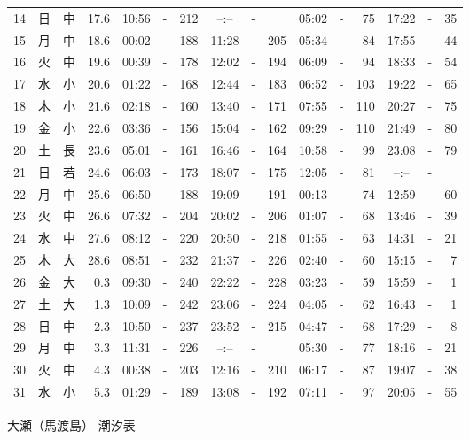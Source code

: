 \documentclass[12pt.a4j]{jsarticle}
\begin{document}
\begin{center}
\begin{table}[ht]
\begin{tabular}{|rc|cr|ccrccr|ccrccr|}
14 & 日 & 中 & 17.6 &  10:56 &-& 212  &  --:-- &-&     &   05:02 &-&  75  &   17:22 &-&  35  \\
15 & 月 & 中 & 18.6 &  00:02 &-& 188  &  11:28 &-& 205  &   05:34 &-&  84  &   17:55 &-&  44  \\
16 & 火 & 中 & 19.6 &  00:39 &-& 178  &  12:02 &-& 194  &   06:09 &-&  94  &   18:33 &-&  54  \\
17 & 水 & 小 & 20.6 &  01:22 &-& 168  &  12:44 &-& 183  &   06:52 &-& 103  &   19:22 &-&  65  \\
18 & 木 & 小 & 21.6 &  02:18 &-& 160  &  13:40 &-& 171  &   07:55 &-& 110  &   20:27 &-&  75  \\
19 & 金 & 小 & 22.6 &  03:36 &-& 156  &  15:04 &-& 162  &   09:29 &-& 110  &   21:49 &-&  80  \\
20 & 土 & 長 & 23.6 &  05:01 &-& 161  &  16:46 &-& 164  &   10:58 &-&  99  &   23:08 &-&  79  \\
21 & 日 & 若 & 24.6 &  06:03 &-& 173  &  18:07 &-& 175  &   12:05 &-&  81  &   --:-- &-&     \\
22 & 月 & 中 & 25.6 &  06:50 &-& 188  &  19:09 &-& 191  &   00:13 &-&  74  &   12:59 &-&  60  \\
23 & 火 & 中 & 26.6 &  07:32 &-& 204  &  20:02 &-& 206  &   01:07 &-&  68  &   13:46 &-&  39  \\
24 & 水 & 中 & 27.6 &  08:12 &-& 220  &  20:50 &-& 218  &   01:55 &-&  63  &   14:31 &-&  21  \\
25 & 木 & 大 & 28.6 &  08:51 &-& 232  &  21:37 &-& 226  &   02:40 &-&  60  &   15:15 &-&   7  \\
26 & 金 & 大 &  0.3 &  09:30 &-& 240  &  22:22 &-& 228  &   03:23 &-&  59  &   15:59 &-&   1  \\
27 & 土 & 大 &  1.3 &  10:09 &-& 242  &  23:06 &-& 224  &   04:05 &-&  62  &   16:43 &-&   1  \\
28 & 日 & 中 &  2.3 &  10:50 &-& 237  &  23:52 &-& 215  &   04:47 &-&  68  &   17:29 &-&   8  \\
29 & 月 & 中 &  3.3 &  11:31 &-& 226  &  --:-- &-&     &   05:30 &-&  77  &   18:16 &-&  21  \\
30 & 火 & 中 &  4.3 &  00:38 &-& 203  &  12:16 &-& 210  &   06:17 &-&  87  &   19:07 &-&  38  \\
31 & 水 & 小 &  5.3 &  01:29 &-& 189  &  13:08 &-& 192  &   07:11 &-&  97  &   20:05 &-&  55  \\
   \hline
   \end{tabular}
\end{table}
\newpage
 {\LARGE 大瀬（馬渡島）  潮汐表　　　}

\end{center}
\end{document}
